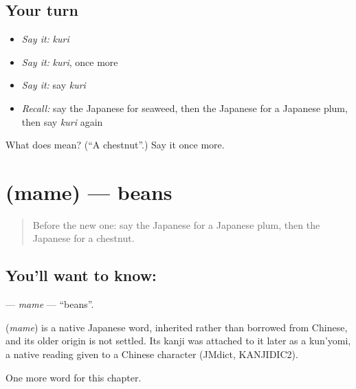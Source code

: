\subsection*{Your turn}
\begin{itemize}
\raggedright
  \item \emph{Say it:} \emph{kuri}
  \item \emph{Say it:} \emph{kuri}, once more
  \item \emph{Say it:} say \emph{kuri}
  \item \emph{Recall:} say the Japanese for seaweed, then the Japanese for a Japanese plum, then say \emph{kuri} again
\end{itemize}

\begin{tcolorbox}[breakable,colback=teal!4,colframe=teal!35!black,title={Before you move on}]
What does  mean? (\textquotedblleft{}A chestnut\textquotedblright{}.) Say it once more.
\end{tcolorbox}
\section[\texorpdfstring{\ja{まめ} (mame)}{まめ (mame)}]{ (mame) — beans}

\label{lesson:JA-C36-mame}



\begin{quote}
Before the new one: say the Japanese for a Japanese plum, then the Japanese for a chestnut.
\end{quote}

\subsection*{You'll want to know: }
\textbf{} — \emph{mame} — \textquotedblleft{}beans\textquotedblright{}.

\begin{cousinweb}
\textbf{} (\emph{mame}) is a native Japanese word, inherited rather than borrowed from Chinese, and its older origin is not settled. Its kanji was attached to it later as a kun'yomi, a native reading given to a Chinese character (JMdict, KANJIDIC2).
\end{cousinweb}

\begin{grammarlens}[title={What you've built}]
One more word for this chapter.
\end{grammarlens}

